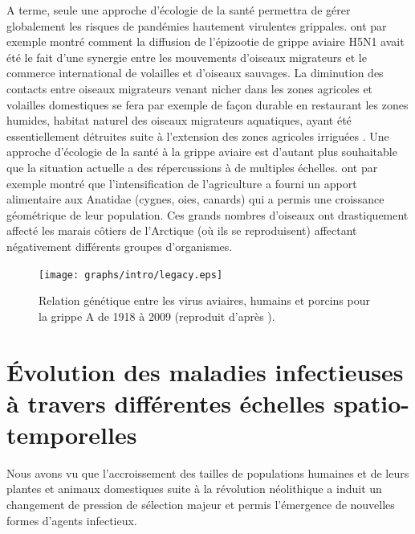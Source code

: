 A terme, seule une approche d'écologie de la santé \citep{Daszak2004,
  Wilcox2005, Kapan2006} permettra de gérer globalement les risques de
pandémies hautement virulentes grippales. \citet{Kilpatrick2006} ont
par exemple montré comment la diffusion de l'épizootie de grippe
aviaire H5N1 avait été le fait d'une synergie entre les mouvements
d'oiseaux migrateurs et le commerce international de volailles et
d'oiseaux sauvages. La diminution des contacts entre oiseaux
migrateurs venant nicher dans les zones agricoles et volailles
domestiques se fera par exemple de façon durable en restaurant les
zones humides, habitat naturel des oiseaux migrateurs aquatiques,
ayant été essentiellement détruites suite à l'extension des zones
agricoles irriguées \citep{Lemly2000}. Une approche d'écologie de la
santé à la grippe aviaire est d'autant plus souhaitable que la
situation actuelle a des répercussions à de multiples échelles.
\citet{Jeffries2004} ont par exemple montré que l'intensification de
l'agriculture a fourni un apport alimentaire aux Anatidae (cygnes,
oies, canards) qui a permis une croissance géométrique de leur
population. Ces grands nombres d'oiseaux ont drastiquement affecté les
marais côtiers de l'Arctique (où ils se reproduisent) affectant
négativement différents groupes d'organismes.


\begin{figure}[!htbp]
  \begin{center}
    \texttt{[image: graphs/intro/legacy.eps]}
  \end{center}
  \caption{Relation génétique entre les virus aviaires, humains et
    porcins pour la grippe A de 1918 à 2009 (reproduit d'après
    \citet{Morens2009}).}
  \label{fig:1:legacy}
\end{figure}



\clearpage


\section{Évolution des maladies infectieuses à travers différentes
  échelles spatio-temporelles}


Nous avons vu que l'accroissement des tailles de populations humaines
et de leurs plantes et animaux domestiques suite à la révolution
néolithique a induit un changement de pression de sélection majeur et
permis l'émergence de nouvelles formes d'agents infectieux.


